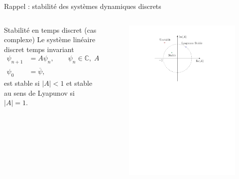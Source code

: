 \documentclass[aspectratio=169, french]{beamer}
\begin{document}
\begin{frame}{Rappel : stabilité des systèmes dynamiques discrets}
	\begin{columns}
		\begin{column}{.55\textwidth}
			\begin{block}{Stabilité en temps discret (cas complexe)}
				Le système linéaire discret temps invariant
				\begin{equation*}
					\begin{aligned}
						\psi_{n+1} &= A \psi_n, \qquad \psi_n \in \mathbb{C},  \; A \in \mathbb{C},\\
						\psi_0 &= \overline{\psi},
					\end{aligned}
				\end{equation*}  
				est stable si $|A|<1$ et stable au sens de Lyapunov si $|A|=1$.
			\end{block}
		\end{column}
		\begin{column}{.45\textwidth}
			\begin{figure}
				\centering
				\includegraphics[height=.7\textheight]{discrete_stability.pdf}
			\end{figure}
		\end{column}
	\end{columns}	
\end{frame}
\end{document}
